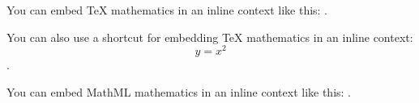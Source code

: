 You can embed TeX mathematics in an inline context like this: .

You can also use a shortcut for embedding TeX mathematics in an inline context: $$y=x^2$$.

You can embed MathML mathematics in an inline context like this: .

